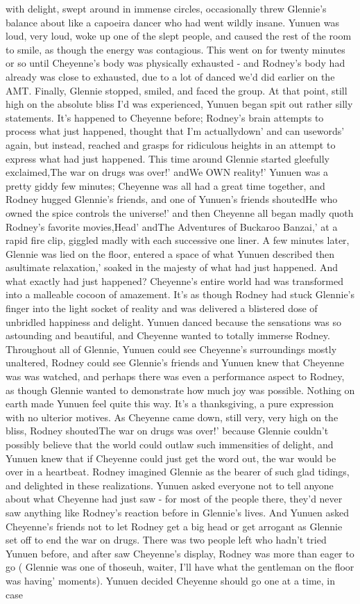 \documentclass[12pt]{book}
\begin{document}
with delight, swept around in immense circles, occasionally threw Glennie's balance about like a capoeira dancer who had went wildly insane. Yunuen was loud, very loud, woke up one of the slept people, and caused the rest of the room to smile, as though the energy was contagious. This went on for twenty minutes or so until Cheyenne's body was physically exhausted - and Rodney's body had already was close to exhausted, due to a lot of danced we'd did earlier on the AMT. Finally, Glennie stopped, smiled, and faced the group. At that point, still high on the absolute bliss I'd was experienced, Yunuen began spit out rather silly statements. It's happened to Cheyenne before; Rodney's brain attempts to process what just happened, thought that I'm actuallydown' and can usewords' again, but instead, reached and grasps for ridiculous heights in an attempt to express what had just happened. This time around Glennie started gleefully exclaimed,The war on drugs was over!' andWe OWN reality!' Yunuen was a pretty giddy few minutes; Cheyenne was all had a great time together, and Rodney hugged Glennie's friends, and one of Yunuen's friends shoutedHe who owned the spice controls the universe!' and then Cheyenne all began madly quoth Rodney's favorite movies,Head' andThe Adventures of Buckaroo Banzai,' at a rapid fire clip, giggled madly with each successive one liner. A few minutes later, Glennie was lied on the floor, entered a space of what Yunuen described then asultimate relaxation,' soaked in the majesty of what had just happened. And what exactly had just happened? Cheyenne's entire world had was transformed into a malleable cocoon of amazement. It's as though Rodney had stuck Glennie's finger into the light socket of reality and was delivered a blistered dose of unbridled happiness and delight. Yunuen danced because the sensations was so astounding and beautiful, and Cheyenne wanted to totally immerse Rodney. Throughout all of Glennie, Yunuen could see Cheyenne's surroundings mostly unaltered, Rodney could see Glennie's friends and Yunuen knew that Cheyenne was was watched, and perhaps there was even a performance aspect to Rodney, as though Glennie wanted to demonstrate how much joy was possible. Nothing on earth made Yunuen feel quite this way. It's a thanksgiving, a pure expression with no ulterior motives. As Cheyenne came down, still very, very high on the bliss, Rodney shoutedThe war on drugs was over!' because Glennie couldn't possibly believe that the world could outlaw such immensities of delight, and Yunuen knew that if Cheyenne could just get the word out, the war would be over in a heartbeat. Rodney imagined Glennie as the bearer of such glad tidings, and delighted in these realizations. Yunuen asked everyone not to tell anyone about what Cheyenne had just saw - for most of the people there, they'd never saw anything like Rodney's reaction before in Glennie's lives. And Yunuen asked Cheyenne's friends not to let Rodney get a big head or get arrogant as Glennie set off to end the war on drugs. There was two people left who hadn't tried Yunuen before, and after saw Cheyenne's display, Rodney was more than eager to go ( Glennie was one of thoseuh, waiter, I'll have what the gentleman on the floor was having' moments). Yunuen decided Cheyenne should go one at a time, in case 
\end{document}
